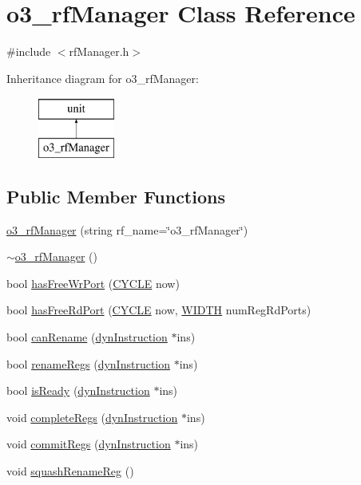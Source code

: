 \hypertarget{classo3__rfManager}{
\section{o3\_\-rfManager Class Reference}
\label{classo3__rfManager}
}


{\ttfamily \#include $<$rfManager.h$>$}

Inheritance diagram for o3\_\-rfManager:\begin{figure}[H]
\begin{center}
\leavevmode
\includegraphics[height=2.000000cm]{classo3__rfManager}
\end{center}
\end{figure}
\subsection*{Public Member Functions}
\begin{DoxyCompactItemize}
\item 
\hyperlink{classo3__rfManager_a0abe0df5acbb3b9d1514b62d38647cff}{o3\_\-rfManager} (string rf\_\-name=\char`\"{}o3\_\-rfManager\char`\"{})
\item 
\hyperlink{classo3__rfManager_a42a66fc34794ca6c7209f743557a2b3a}{$\sim$o3\_\-rfManager} ()
\item 
bool \hyperlink{classo3__rfManager_a95bfea851bf8107f208e550839749063}{hasFreeWrPort} (\hyperlink{global_2global_8h_a7e19a550ec11d1ed921deb20c22efb5b}{CYCLE} now)
\item 
bool \hyperlink{classo3__rfManager_a0883b605da49fe18bf7a1a04219307ab}{hasFreeRdPort} (\hyperlink{global_2global_8h_a7e19a550ec11d1ed921deb20c22efb5b}{CYCLE} now, \hyperlink{global_2global_8h_a6fa2e24b8a418fa215e183264cbea3aa}{WIDTH} numRegRdPorts)
\item 
bool \hyperlink{classo3__rfManager_a023f3671f90123fe8749ff13606f273c}{canRename} (\hyperlink{classdynInstruction}{dynInstruction} $\ast$ins)
\item 
bool \hyperlink{classo3__rfManager_a702dcade81b3d2ccba4bae0ef8d7de30}{renameRegs} (\hyperlink{classdynInstruction}{dynInstruction} $\ast$ins)
\item 
bool \hyperlink{classo3__rfManager_a9b85902c553b147228d0bb3b57280ca7}{isReady} (\hyperlink{classdynInstruction}{dynInstruction} $\ast$ins)
\item 
void \hyperlink{classo3__rfManager_a06b8854ab37feb6b44166a8565dc447a}{completeRegs} (\hyperlink{classdynInstruction}{dynInstruction} $\ast$ins)
\item 
void \hyperlink{classo3__rfManager_a7d3aa6c1316bac1153b24b7764d301fb}{commitRegs} (\hyperlink{classdynInstruction}{dynInstruction} $\ast$ins)
\item 
void \hyperlink{classo3__rfManager_ac8199decc9c7a881b2099a68711cced7}{squashRenameReg} ()
\end{DoxyCompactItemize}


